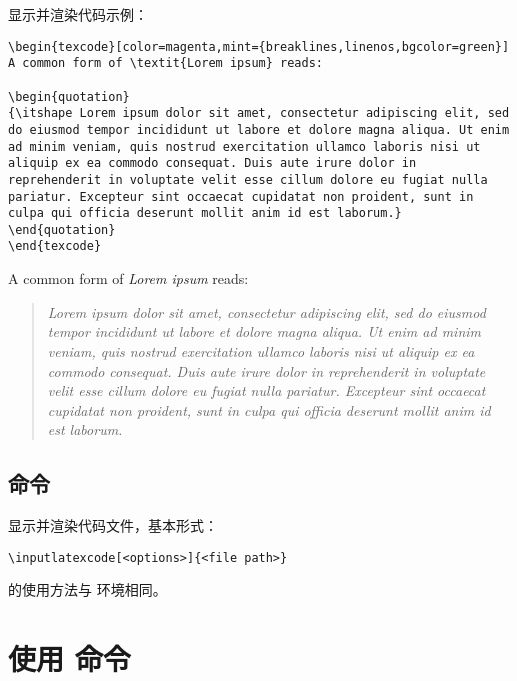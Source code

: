 显示并渲染代码示例：

\begin{verbatim}
\begin{texcode}[color=magenta,mint={breaklines,linenos,bgcolor=green}]
A common form of \textit{Lorem ipsum} reads:

\begin{quotation}
{\itshape Lorem ipsum dolor sit amet, consectetur adipiscing elit, sed do eiusmod tempor incididunt ut labore et dolore magna aliqua. Ut enim ad minim veniam, quis nostrud exercitation ullamco laboris nisi ut aliquip ex ea commodo consequat. Duis aute irure dolor in reprehenderit in voluptate velit esse cillum dolore eu fugiat nulla pariatur. Excepteur sint occaecat cupidatat non proident, sunt in culpa qui officia deserunt mollit anim id est laborum.}
\end{quotation}
\end{texcode}
\end{verbatim}

\begin{texcode}[color=magenta,mint={breaklines,linenos,bgcolor=green}]
A common form of \textit{Lorem ipsum} reads:

\begin{quotation}
{\itshape Lorem ipsum dolor sit amet, consectetur adipiscing elit, sed do eiusmod tempor incididunt ut labore et dolore magna aliqua. Ut enim ad minim veniam, quis nostrud exercitation ullamco laboris nisi ut aliquip ex ea commodo consequat. Duis aute irure dolor in reprehenderit in voluptate velit esse cillum dolore eu fugiat nulla pariatur. Excepteur sint occaecat cupidatat non proident, sunt in culpa qui officia deserunt mollit anim id est laborum.}
\end{quotation}
\end{texcode}


\subsection{\protect{} 命令}
显示并渲染代码文件，基本形式：

\begin{verbatim}
\inputlatexcode[<options>]{<file path>}
\end{verbatim}

 的使用方法与  环境相同。

\section{使用 \protect{} 命令}

